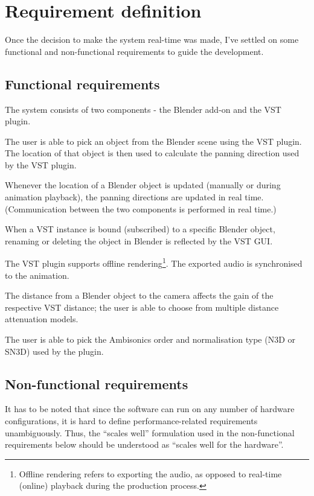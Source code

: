 \section{Requirement definition}
Once the decision to make the system real-time was made, I've settled on some functional and non-functional requirements to guide the development.
\subsection*{Functional requirements}
\begin{funcreqs}
    \item The system consists of two components - the Blender add-on and the VST plugin.
    \item The user is able to pick an object from the Blender scene using the VST plugin.
    The location of that object is then used to calculate the panning direction used by the VST plugin.
    \item Whenever the location of a Blender object is updated (manually or during animation playback), 
    the panning directions are updated in real time. (Communication between the two components is performed in real time.)
    \item When a VST instance is bound (subscribed) to a specific Blender object, renaming or deleting the object in Blender is reflected by the VST GUI.
    \item The VST plugin supports offline rendering\footnote{Offline rendering refers to exporting the audio, as opposed to real-time (online) playback during the production process.}.
    The exported audio is synchronised to the animation.
    \item The distance from a Blender object to the camera affects the gain of the respective VST distance; 
    the user is able to choose from multiple distance attenuation models.
    \item The user is able to pick the Ambisonics order and normalisation type (N3D or SN3D) used by the plugin.
\end{funcreqs}

\subsection*{Non-functional requirements}
It has to be noted that since the software can run on any number of hardware configurations,
it is hard to define performance-related requirements unambiguously. 
Thus, the ``scales well'' formulation used in the non-functional requirements below
should be understood as ``scales well for the hardware''.

